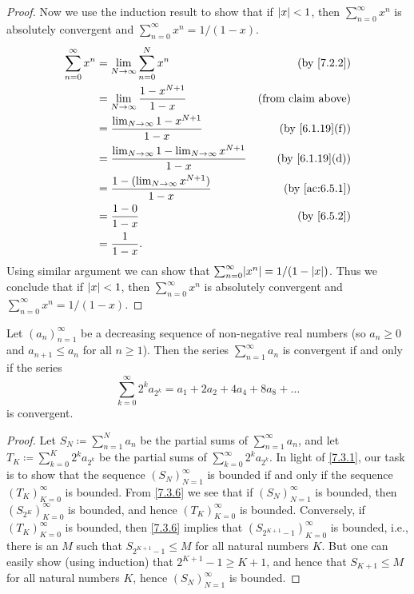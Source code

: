 \begin{proof}
  Now we use the induction result to show that if \(\left\lvert x\right\rvert < 1\), then \(\sum_{n = 0}^\infty x^n\) is absolutely convergent and \(\sum_{n = 0}^\infty x^n = 1 / (1 - x)\).
  \begin{align*}
    \sum_{n = 0}^\infty x^n & = \lim_{N \to \infty} \sum_{n = 0}^N x^n                              & \text{(by \cref{7.2.2})}     \\
                            & = \lim_{N \to \infty} \frac{1 - x^{N + 1}}{1 - x}                     & \text{(from claim above)}    \\
                            & = \frac{\lim_{N \to \infty} 1 - x^{N + 1}}{1 - x}                     & \text{(by \cref{6.1.19}(f))} \\
                            & = \frac{\lim_{N \to \infty} 1 - \lim_{N \to \infty} x^{N + 1}}{1 - x} & \text{(by \cref{6.1.19}(d))} \\
                            & = \frac{1 - (\lim_{N \to \infty} x^{N + 1})}{1 - x}                   & \text{(by \cref{ac:6.5.1})}  \\
                            & = \frac{1 - 0}{1 - x}                                                 & \text{(by \cref{6.5.2})}     \\
                            & = \frac{1}{1 - x}.
  \end{align*}
  Using similar argument we can show that \(\sum_{n = 0}^\infty \abs{x^n} = 1 / (1 - \abs{x})\).
  Thus we conclude that if \(\left\lvert x\right\rvert < 1\), then \(\sum_{n = 0}^\infty x^n\) is absolutely convergent and \(\sum_{n = 0}^\infty x^n = 1 / (1 - x)\).
\end{proof}

\begin{prop}\label{7.3.4}
  Let \((a_n)_{n = 1}^\infty\) be a decreasing sequence of non-negative real numbers
  (so \(a_n \geq 0\) and \(a_{n + 1} \leq a_n\) for all \(n \geq 1\)).
  Then the series \(\sum_{n = 1}^\infty a_n\) is convergent if and only if the series
  \[
    \sum_{k = 0}^\infty 2^k a_{2^k} = a_1 + 2a_2 + 4a_4 + 8a_8 + \dots
  \]
  is convergent.
\end{prop}

\begin{proof}
  Let \(S_N \coloneqq \sum_{n = 1}^N a_n\) be the partial sums of \(\sum_{n = 1}^\infty a_n\), and let \(T_K \coloneqq \sum_{k = 0}^K 2^k a_{2^k}\) be the partial sums of \(\sum_{k = 0}^\infty 2^k a_{2^k}\).
  In light of \cref{7.3.1}, our task is to show that the sequence \((S_N)_{N = 1}^\infty\) is bounded if and only if the sequence \((T_K)_{K = 0}^\infty\) is bounded.
  From \cref{7.3.6} we see that if \((S_N)_{N = 1}^\infty\) is bounded, then \((S_{2^K})_{K = 0}^\infty\) is bounded, and hence \((T_K)_{K = 0}^\infty\) is bounded.
  Conversely, if \((T_K)_{K = 0}^\infty\) is bounded, then \cref{7.3.6} implies that \((S_{2^{K + 1} - 1})_{K = 0}^\infty\) is bounded, i.e., there is an \(M\) such that \(S_{2^{K + 1} - 1} \leq M\) for all natural numbers \(K\).
  But one can easily show (using induction) that \(2^{K + 1} - 1 \geq K + 1\), and hence that \(S_{K + 1} \leq M\) for all natural numbers \(K\), hence \((S_N)_{N = 1}^\infty\) is bounded.
\end{proof}

